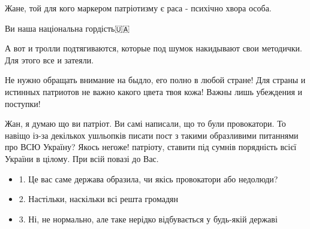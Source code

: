 \begin{itemize}
Жане, той для кого маркером патріотизму є раса - психічно хвора особа.

Ви наша національна гордість🇺🇦 🙏


 
А вот и тролли подтягиваются, которые под шумок накидывают свои методички. Для этого все и затеяли.

 

Не нужно обращать внимание на быдло, его полно в любой стране! Для страны и
истинных патриотов не важно какого цвета твоя кожа! Важны лишь убеждения и
поступки!

 

\obeycr
Жан, я думаю що ви патріот.
Ви самі написали, що то були провокатори.
То навіщо із-за декількох ушльопків писати пост з такими образливими питаннями про ВСЮ Україну?
Якось негоже! патріоту, ставити під сумнів порядність всієї України в цілому.
При всій повазі до Вас.
\restorecr


 

\begin{itemize}
  \item 1. Це вас саме держава образила, чи якісь провокатори або недолюди?
  \item 2. Настільки, наскільки всі решта громадян
  \item 3. Ні, не нормально, але таке нерідко відбувається у будь-якій державі
\end{itemize}


 


\end{itemize}
